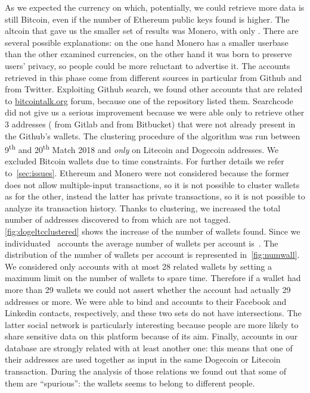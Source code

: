 As we expected the currency on which, potentially, we could retrieve more data
is still Bitcoin, even if the number of Ethereum public keys found is higher.
The altcoin that gave us the smaller set of results was Monero, with only
\startingXMR{}. There are several possible explanations: on the one hand Monero
has a smaller userbase than the other examined currencies, on the other hand it
was born to preserve users' privacy, so people could be more reluctant to
advertise it.
The accounts retrieved in this phase come from different sources in particular
\accountGithub{} from Github and \accountTwitter{} from Twitter.
Exploiting Github search, we found other \accountBitcointalk{}
accounts that are related to \url{bitcointalk.org} forum, because one
of the repository listed them. Searchcode did not give us a serious improvement
because we were able only to retrieve other 3 addresses (\accountGitlab{} from
Gitlab and \accountBitbucket{} from Bitbucket) that were not already present in
the Github's wallets.
The clustering procedure of the algorithm was run between 9\textsuperscript{th}
and 20\textsuperscript{th} Match 2018 and \emph{only} on Litecoin and Dogecoin
addresses. We excluded Bitcoin wallets due to time constraints.
For further details we refer to~\autoref{sec:issues}. Ethereum and Monero were
not considered because the former does not allow multiple-input transactions,
so it is not possible to cluster wallets as for the other, instead the latter
has private transactions, so it is not possible to analyze its transaction
history.
Thanks to clustering, we increased the total number of addresses
discovered
to \clusteringNumberAllWallets{} from which
\clusteringNumberWalletsNotService{} are not tagged.
\autoref{fig:dogeltcclustered} shows the increase of the number of
wallets found.
Since we individuated~\accountNumber{} accounts the average number
of wallets per account is~\avarageAccount{}.
The distribution of the number of wallets per account is represented
in~\autoref{fig:numwall}. We considered only accounts with at most 28 related
wallets by setting a maximum limit on the number of
wallets to spare time.
Therefore if a wallet had more than 29 wallets we could not assert whether
the account had actually 29 addresses or more.
We were able to bind \facebookRelatedAccounts{} and \linkedinRelatedAccount{}
accounts to their Facebook and Linkedin contacts, respectively, and these two
sets do not have intersections. The latter social network is particularly
interesting because people are more likely to share sensitive data on this
platform because of its aim.
Finally, \accountRelated{} accounts in our database are strongly related with
at least another one: this means that one of their addresses are used together
as input in the same Dogecoin or Litecoin transaction. During the analysis of
those relations we found out that some of them are ``spurious'': the wallets
seems to belong to different people.

